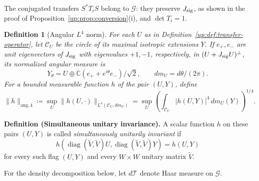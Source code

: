 \documentclass[11pt]{article}
\numberwithin{equation}{section}
\newtheorem{definition}[theorem]{Definition}
\theoremstyle{remark}
\newcommand{\C}{\mathbb C}
\newcommand{\diag}{\operatorname{diag}}
\begin{document}
The conjugated transfers $S^*T_iS$ belong to
$\mathcal G$: they preserve $J_{\rm sig}$, as shown in the proof of
Proposition~\ref{up:prop:conversion}\textup{(i)}, and $\det T_i=1$.

\begin{definition}[Angular $L^4$ norm]\label{up:def:angular-norm}
For each $U$ as in Definition~\ref{up:def:transfer-operator}, let
$\mathcal C_U$ be the circle of its maximal isotropic extensions $Y$.
If $e_+,e_-$ are unit eigenvectors of $J_{\rm sig}$ with eigenvalues
$+1,-1$, respectively, in $(U+J_{\rm sig}U)^\perp$, its normalized angular measure is
\[
 Y_\theta=U\oplus\C(e_++e^{i\theta}e_-)/\sqrt2,
 \qquad dm_U=d\theta/(2\pi).
\]
For a bounded measurable function $h$ of the pair $(U,Y)$, define
\[
 \|h\|_{\mathrm{ang},4}
 \coloneqq\sup_U\|h(U,\cdot)\|_{L^4(\mathcal C_U,dm_U)}
 =\sup_U\left(\int_{\mathcal C_U}|h(U,Y)|^4\,dm_U(Y)\right)^{1/4}.
\]
\end{definition}

\noindent\textbf{Definition (Simultaneous unitary invariance).}
A scalar function $h$ on these pairs $(U,Y)$ is called
\emph{simultaneously unitarily invariant} if
\begin{equation}\label{up:eq:invariant-function}
 h(\diag(\widetilde V,\widetilde V)U,
   \diag(\widetilde V,\widetilde V)Y)=h(U,Y)
\end{equation}
for every such flag $(U,Y)$ and every $W\times W$ unitary matrix
$\widetilde V$.

For the density decomposition below, let $d\mathcal T$ denote
Haar measure on $\mathcal G$.
\end{document}
